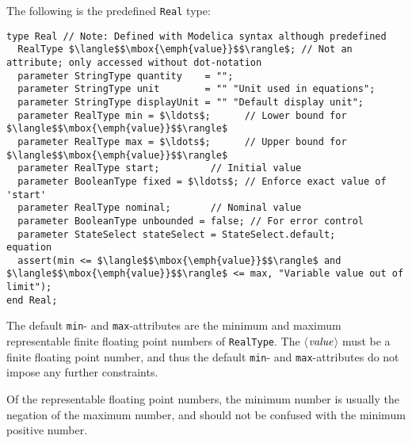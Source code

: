 The following is the predefined \lstinline!Real! type:
\begin{lstlisting}[language=modelica]
type Real // Note: Defined with Modelica syntax although predefined
  RealType $\langle$$\mbox{\emph{value}}$$\rangle$; // Not an attribute; only accessed without dot-notation
  parameter StringType quantity    = "";
  parameter StringType unit        = "" "Unit used in equations";
  parameter StringType displayUnit = "" "Default display unit";
  parameter RealType min = $\ldots$;      // Lower bound for $\langle$$\mbox{\emph{value}}$$\rangle$
  parameter RealType max = $\ldots$;      // Upper bound for $\langle$$\mbox{\emph{value}}$$\rangle$
  parameter RealType start;         // Initial value
  parameter BooleanType fixed = $\ldots$; // Enforce exact value of 'start'
  parameter RealType nominal;       // Nominal value
  parameter BooleanType unbounded = false; // For error control
  parameter StateSelect stateSelect = StateSelect.default;
equation
  assert(min <= $\langle$$\mbox{\emph{value}}$$\rangle$ and $\langle$$\mbox{\emph{value}}$$\rangle$ <= max, "Variable value out of limit");
end Real;
\end{lstlisting}%
%
%
%
%
%
%
%
%
%

The default \lstinline!min!- and \lstinline!max!-attributes are the minimum and maximum representable finite floating point numbers of \lstinline!RealType!.
The $\langle$$\mbox{\emph{value}}$$\rangle$ must be a finite floating point number, and thus the default \lstinline!min!- and \lstinline!max!-attributes do not impose any further constraints.

\begin{nonnormative}
Of the representable floating point numbers, the minimum number is usually the negation of the maximum number, and should not be confused with the minimum positive number.
\end{nonnormative}

